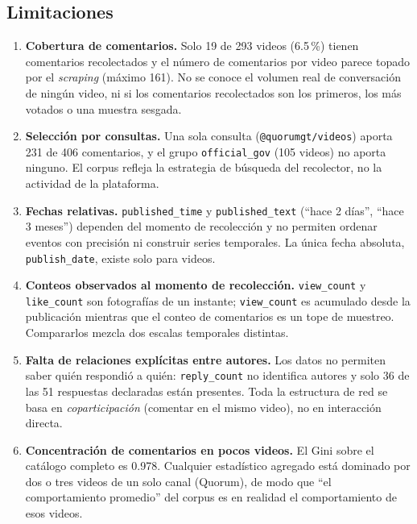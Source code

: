 \documentclass[11pt,a4paper]{article}
\begin{document}
\subsection{Limitaciones}
\begin{enumerate}[leftmargin=1.6em,itemsep=3pt]
\item \textbf{Cobertura de comentarios.} Solo 19 de 293 videos (6.5\,\%) tienen comentarios
recolectados y el n\'umero de comentarios por video parece topado por el \emph{scraping}
(m\'aximo 161). No se conoce el volumen real de conversaci\'on de ning\'un video, ni si los
comentarios recolectados son los primeros, los m\'as votados o una muestra sesgada.
\item \textbf{Selecci\'on por consultas.} Una sola consulta (\texttt{@quorumgt/videos}) aporta 231 de
406 comentarios, y el grupo \texttt{official\_gov} (105 videos) no aporta ninguno. El corpus refleja
la estrategia de b\'usqueda del recolector, no la actividad de la plataforma.
\item \textbf{Fechas relativas.} \texttt{published\_time} y \texttt{published\_text} (``hace 2 d\'ias'',
``hace 3 meses'') dependen del momento de recolecci\'on y no permiten ordenar eventos con precisi\'on
ni construir series temporales. La \'unica fecha absoluta, \texttt{publish\_date}, existe solo para
videos.
\item \textbf{Conteos observados al momento de recolecci\'on.} \texttt{view\_count} y
\texttt{like\_count} son fotograf\'ias de un instante; \texttt{view\_count} es acumulado desde la
publicaci\'on mientras que el conteo de comentarios es un tope de muestreo. Compararlos mezcla dos
escalas temporales distintas.
\item \textbf{Falta de relaciones expl\'icitas entre autores.} Los datos no permiten saber qui\'en
respondi\'o a qui\'en: \texttt{reply\_count} no identifica autores y solo 36 de las 51 respuestas
declaradas est\'an presentes. Toda la estructura de red se basa en \emph{coparticipaci\'on}
(comentar en el mismo video), no en interacci\'on directa.
\item \textbf{Concentraci\'on de comentarios en pocos videos.} El Gini sobre el cat\'alogo completo es
0.978. Cualquier estad\'istico agregado est\'a dominado por dos o tres videos de un solo canal (Quorum),
de modo que ``el comportamiento promedio'' del corpus es en realidad el comportamiento de esos videos.
\end{enumerate}
\end{document}
